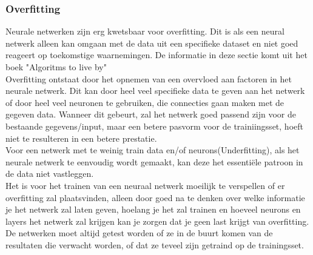 \subsubsection{Overfitting}
Neurale netwerken zijn erg kwetsbaar voor overfitting. Dit is als een neural netwerk alleen kan omgaan met de data uit een specifieke dataset en niet goed reageert op toekomstige waarnemingen. De informatie in deze sectie komt uit het boek "Algoritms to live by" \cite{algoritms}\\ 
\newline
Overfitting ontstaat door het opnemen van een overvloed aan factoren in het neurale netwerk. Dit kan door heel veel specifieke data te geven aan het netwerk of door heel veel neuronen te gebruiken, die connecties gaan maken met de gegeven data. Wanneer dit gebeurt, zal het netwerk goed passend zijn voor de bestaande gegevens/input, maar een betere pasvorm voor de trainiingsset, hoeft niet te resulteren in een betere prestatie. \\
\newline
Voor een netwerk met te weinig train data en/of neurons(Underfitting), als het neurale netwerk te eenvoudig wordt gemaakt, kan deze het essenti\"ele patroon in de data niet vastleggen.\\
\newline
Het is voor het trainen van een neuraal netwerk moeilijk te verspellen of er overfitting zal plaatsvinden, alleen door goed na te denken over welke informatie je het netwerk zal laten geven, hoelang je het zal trainen en hoeveel neurons en layers het netwerk zal krijgen kan je zorgen dat je geen last krijgt van overfitting. De netwerken moet altijd getest worden of ze in de buurt komen van de resultaten die verwacht worden, of dat ze teveel zijn getraind op de trainingsset.
